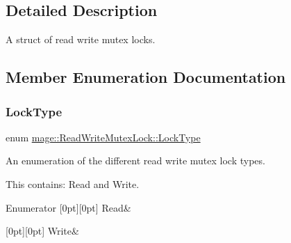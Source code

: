 \subsection{Detailed Description}
A struct of read write mutex locks. 

\subsection{Member Enumeration Documentation}
\hypertarget{structmage_1_1_read_write_mutex_lock_a5fee0529edf58803ee1f5d4afa084a3b}{}\label{structmage_1_1_read_write_mutex_lock_a5fee0529edf58803ee1f5d4afa084a3b} 
\subsubsection{\texorpdfstring{Lock\+Type}{LockType}}
{\footnotesize\ttfamily enum \hyperlink{structmage_1_1_read_write_mutex_lock_a5fee0529edf58803ee1f5d4afa084a3b}{mage\+::\+Read\+Write\+Mutex\+Lock\+::\+Lock\+Type}\hspace{0.3cm}{\ttfamily [strong]}}

An enumeration of the different read write mutex lock types.

This contains\+: {\ttfamily Read} and {\ttfamily Write}. \begin{DoxyEnumFields}{Enumerator}
[0pt][0pt]{}\hypertarget{structmage_1_1_read_write_mutex_lock_a5fee0529edf58803ee1f5d4afa084a3ba7a1a5f3e79fdc91edf2f5ead9d66abb4}{}\label{structmage_1_1_read_write_mutex_lock_a5fee0529edf58803ee1f5d4afa084a3ba7a1a5f3e79fdc91edf2f5ead9d66abb4} 
Read&\\
\hline

[0pt][0pt]{}\hypertarget{structmage_1_1_read_write_mutex_lock_a5fee0529edf58803ee1f5d4afa084a3ba1129c0e4d43f2d121652a7302712cff6}{}\label{structmage_1_1_read_write_mutex_lock_a5fee0529edf58803ee1f5d4afa084a3ba1129c0e4d43f2d121652a7302712cff6} 
Write&\\
\hline

\end{DoxyEnumFields}


